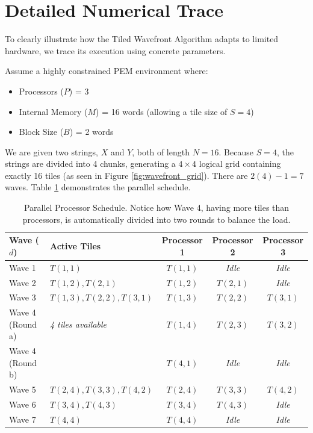 \section{Detailed Numerical Trace}

To clearly illustrate how the Tiled Wavefront Algorithm adapts to limited hardware, we trace its execution using concrete parameters. 

Assume a highly constrained PEM environment where:
\begin{itemize}
    \item Processors ($P$) = 3
    \item Internal Memory ($M$) = 16 words (allowing a tile size of $S = 4$)
    \item Block Size ($B$) = 2 words
\end{itemize}

We are given two strings, $X$ and $Y$, both of length $N=16$. Because $S=4$, the strings are divided into 4 chunks, generating a $4 \times 4$ logical grid containing exactly 16 tiles (as seen in Figure \ref{fig:wavefront_grid}). There are $2(4) - 1 = 7$ waves. Table \ref{tab:processor_schedule} demonstrates the parallel schedule.

\begin{table}[h!]
\centering
\renewcommand{\arraystretch}{1.2}
\begin{tabular}{@{}llccc@{}}
\toprule
\textbf{Wave ($d$)} & \textbf{Active Tiles} & \textbf{Processor 1} & \textbf{Processor 2} & \textbf{Processor 3} \\ \midrule
Wave 1 & $T(1,1)$ & $T(1,1)$ & \textit{Idle} & \textit{Idle} \\
Wave 2 & $T(1,2), T(2,1)$ & $T(1,2)$ & $T(2,1)$ & \textit{Idle} \\
Wave 3 & $T(1,3), T(2,2), T(3,1)$ & $T(1,3)$ & $T(2,2)$ & $T(3,1)$ \\
\midrule
Wave 4 (Round a) & \textit{4 tiles available} & $T(1,4)$ & $T(2,3)$ & $T(3,2)$ \\
Wave 4 (Round b) & & $T(4,1)$ & \textit{Idle} & \textit{Idle} \\
\midrule
Wave 5 & $T(2,4), T(3,3), T(4,2)$ & $T(2,4)$ & $T(3,3)$ & $T(4,2)$ \\
Wave 6 & $T(3,4), T(4,3)$ & $T(3,4)$ & $T(4,3)$ & \textit{Idle} \\
Wave 7 & $T(4,4)$ & $T(4,4)$ & \textit{Idle} & \textit{Idle} \\ \bottomrule
\end{tabular}
\caption{Parallel Processor Schedule. Notice how Wave 4, having more tiles than processors, is automatically divided into two rounds to balance the load.}
\label{tab:processor_schedule}
\end{table}

